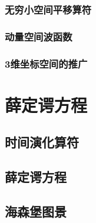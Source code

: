 \documentclass[a4paper,11pt]{ctexart}
\begin{document}
\subsubsection{无穷小空间平移算符}
\subsubsection{动量空间波函数}
\subsubsection{3维坐标空间的推广}

\section{薛定谔方程}
\subsection{时间演化算符}
\subsection{薛定谔方程}
\subsection{海森堡图景}
\end{document}
